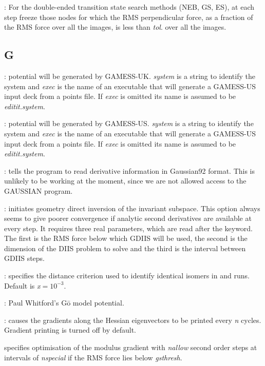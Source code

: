 {{: For the double-ended transition state search
  methods (NEB, GS, ES), at each step freeze those nodes for which the RMS
  perpendicular force, as a fraction of the RMS force over all the images, is
  less than {\it tol\/}.  over all the images.

\subsection{G}
: potential will be generated by GAMESS-UK.
{\it system\/} is a string to identify the system and {\it exec\/} is
the name of an executable that will generate a GAMESS-US input deck from a points file.
If {\it exec\/} is omitted its name is assumed to be {\it editit.system}.
 
: potential will be generated by GAMESS-US.
{\it system\/} is a string to identify the system and {\it exec\/} is
the name of an executable that will generate a GAMESS-US input deck from a points file.
If {\it exec\/} is omitted its name is assumed to be {\it editit.system}.

: tells the program to read derivative information in
Gaussian92 format. This is unlikely to be working at the moment, since we 
are not allowed access to the GAUSSIAN program.

: initiates geometry direct inversion of the
invariant subspace. This option always seems to give poorer convergence
if analytic second derivatives are available at every step. It requires
three real parameters, which are read after the {} keyword. The
first is the RMS force below which GDIIS will be used, the second is the 
dimension of the DIIS problem to solve and the third is the interval between
GDIIS steps. 

: specifies the distance criterion used to identify identical isomers
in  and  runs. Default is {\it x}$=10^{-3}$.

: Paul Whitford's G\={o} model potential.

: causes the gradients along the Hessian
eigenvectors to be printed every {\it n\/} cycles. Gradient printing is turned off by default.

 specifies optimisation of the modulus gradient
with {\it nallow\/} second order steps at intervals of {\it nspecial\/} 
if the RMS force lies below {\it gsthresh\/}.

}}
